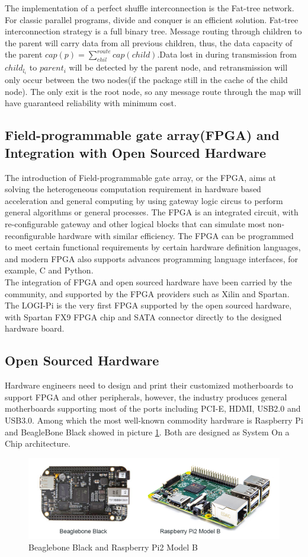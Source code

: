 \documentclass[11pt,openright,a4paper]{report}
\begin{document}
The implementation of a perfect shuffle interconnection is the Fat-tree network. For classic parallel programs, divide and conquer is an efficient solution\cite{aho1974design}. Fat-tree interconnection strategy is a full binary tree. Message routing through children to the parent will carry data from all previous children, thus, the data capacity of the parent $cap(p)=\sum_{chil}^{route}cap(child)$.Data lost in during transmission from $child_{l_{i}}$ to $parent_{i}$ will be detected by the parent node, and retransmission will only occur between the two nodes(if the package still in the cache of the child node). The only exit is the root node, so any message route through the map will have guaranteed reliability with minimum cost.
\subsection{Field-programmable gate array(FPGA) and Integration with Open Sourced Hardware}
The introduction of Field-programmable gate array, or the FPGA, aims at solving the heterogeneous computation requirement in hardware based acceleration and general computing by using gateway logic circus to perform general algorithms or general processes\cite{hauck2010reconfigurable}. The FPGA is an integrated circuit, with re-configurable gateway and other logical blocks that can simulate most non-reconfigurable hardware with similar efficiency. The FPGA can be programmed to meet certain functional requirements by certain hardware definition languages, and modern FPGA also supports advances programming language interfaces, for example, C and Python.\\
The integration of FPGA and open sourced hardware have been carried by the community, and supported by the FPGA providers such as Xilin and Spartan. The LOGI-Pi is the very first FPGA supported by the open sourced hardware, with Spartan FX9 FPGA chip and SATA connector directly to the designed hardware board\cite{logipi}.
\subsection{Open Sourced Hardware}
Hardware engineers need to design and print their customized motherboards to support FPGA and other peripherals, however, the industry produces general motherboards supporting most of the ports including PCI-E, HDMI, USB2.0 and USB3.0. Among which the most well-known commodity hardware is Raspberry Pi and BeagleBone Black showed in picture \ref{fig:commodityhardware}. Both are designed as System On a Chip architecture.\\ 
\begin{figure}
\centering
\includegraphics[width=0.7\linewidth]{picture/commodityhardware.jpg}
\caption{Beaglebone Black and Raspberry Pi2 Model B}
\label{fig:commodityhardware}
\end{figure}
\end{document}
